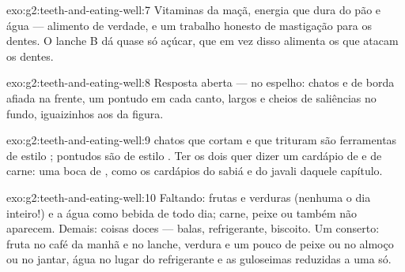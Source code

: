 \begin{solution}{exo:g2:teeth-and-eating-well:7}
Vitaminas da maçã, energia que dura do pão e água --- alimento de
verdade, e um trabalho honesto de mastigação para os dentes. O
lanche B dá quase só açúcar, que em vez disso alimenta os 
que atacam os dentes.
\end{solution}

\begin{solution}{exo:g2:teeth-and-eating-well:8}
Resposta aberta --- no espelho:  chatos e de borda afiada
na frente, um  pontudo em cada canto,  largos e cheios
de saliências no fundo, iguaizinhos aos da figura.
\end{solution}

\begin{solution}{exo:g2:teeth-and-eating-well:9}
 chatos que cortam e  que trituram são ferramentas
de estilo ;  pontudos são de estilo . Ter
os dois quer dizer um cardápio de  e de carne: uma boca de
, como os cardápios do sabiá e do javali daquele capítulo.
\end{solution}

\begin{solution}{exo:g2:teeth-and-eating-well:10}
Faltando: frutas e verduras (nenhuma o dia inteiro!) e a água como
bebida de todo dia; carne, peixe ou  também não aparecem. Demais:
coisas doces --- balas, refrigerante, biscoito. Um conserto: fruta
no café da manhã e no lanche, verdura e um pouco de peixe ou  no
almoço ou no jantar, água no lugar do refrigerante e as guloseimas
reduzidas a uma só.
\end{solution}
